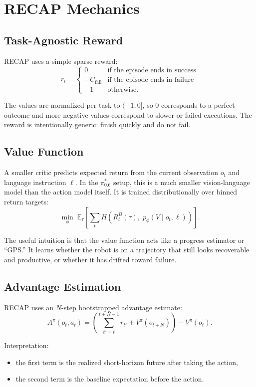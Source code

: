 \documentclass[11pt]{article}
\begin{document}
\section{RECAP Mechanics}

\subsection{Task-Agnostic Reward}

RECAP uses a simple sparse reward:
\[
r_t =
\begin{cases}
0 & \text{if the episode ends in success} \\
-C_{\text{fail}} & \text{if the episode ends in failure} \\
-1 & \text{otherwise.}
\end{cases}
\]

The values are normalized per task to \((-1, 0]\), so \(0\) corresponds to a perfect outcome and more negative values correspond to slower or failed executions. The reward is intentionally generic: finish quickly and do not fail.

\subsection{Value Function}

A smaller critic predicts expected return from the current observation \(o_t\) and language instruction \(\ell\). In the \(\pi^{*}_{0.6}\) setup, this is a much smaller vision-language model than the action model itself. It is trained distributionally over binned return targets:
\[
\min_{\phi}\; \mathbb{E}_{\tau} \left[\sum_t H\!\left(R_t^B(\tau),\; p_{\phi}(V \mid o_t, \ell)\right)\right].
\]

The useful intuition is that the value function acts like a progress estimator or ``GPS.'' It learns whether the robot is on a trajectory that still looks recoverable and productive, or whether it has drifted toward failure.

\subsection{Advantage Estimation}

RECAP uses an \(N\)-step bootstrapped advantage estimate:
\[
A^{\pi}(o_t, a_t)
=
\left(\sum_{t'=t}^{t+N-1} r_{t'} + V^{\pi}(o_{t+N})\right)
- V^{\pi}(o_t).
\]

Interpretation:
\begin{itemize}[leftmargin=1.5em]
  \item the first term is the realized short-horizon future after taking the action,
  \item the second term is the baseline expectation before the action.
\end{itemize}
\end{document}
